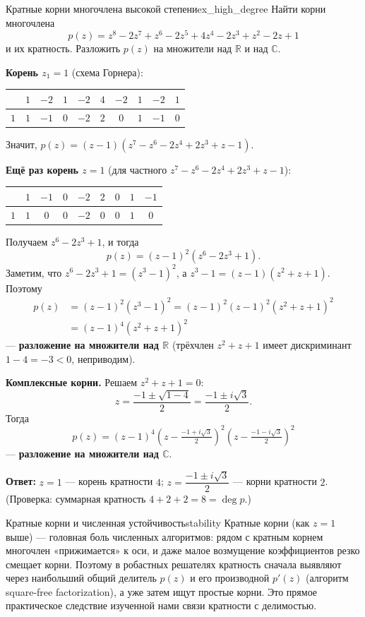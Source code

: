 \documentclass[12pt,a4paper]{article}
\begin{document}
\begin{definition}{Кратные корни многочлена высокой степени}{ex_high_degree}
Найти корни многочлена
\[
p(z) = z^8 - 2z^7 + z^6 - 2z^5 + 4z^4 - 2z^3 + z^2 - 2z + 1
\]
и их кратность. Разложить $p(z)$ на множители над $\mathbb{R}$ и над
$\mathbb{C}$.

\medskip
\textbf{Корень $z_1 = 1$} (схема Горнера):
\begin{center}
\renewcommand{\arraystretch}{1.3}
\begin{tabular}{c|ccccccccc}
& $1$ & $-2$ & $1$ & $-2$ & $4$ & $-2$ & $1$ & $-2$ & $1$ \\
\hline
$1$ & $1$ & $-1$ & $0$ & $-2$ & $2$ & $0$ & $1$ & $-1$ & $0$ \\
\end{tabular}
\end{center}
Значит, $p(z) = (z - 1)(z^7 - z^6 - 2z^4 + 2z^3 + z - 1)$.

\textbf{Ещё раз корень $z = 1$} (для частного $z^7 - z^6 - 2z^4 +
2z^3 + z - 1$):
\begin{center}
\renewcommand{\arraystretch}{1.3}
\begin{tabular}{c|cccccccc}
& $1$ & $-1$ & $0$ & $-2$ & $2$ & $0$ & $1$ & $-1$ \\
\hline
$1$ & $1$ & $0$ & $0$ & $-2$ & $0$ & $0$ & $1$ & $0$ \\
\end{tabular}
\end{center}
Получаем $z^6 - 2z^3 + 1$, и тогда
\[
p(z) = (z - 1)^2 (z^6 - 2z^3 + 1).
\]
Заметим, что $z^6 - 2z^3 + 1 = (z^3 - 1)^2$, а
$z^3 - 1 = (z - 1)(z^2 + z + 1)$. Поэтому
\begin{align*}
p(z) &= (z - 1)^2 (z^3 - 1)^2
= (z - 1)^2 (z - 1)^2 (z^2 + z + 1)^2 \\
&= (z - 1)^4 (z^2 + z + 1)^2
\end{align*}
— \textbf{разложение на множители над $\mathbb{R}$} (трёхчлен
$z^2 + z + 1$ имеет дискриминант $1 - 4 = -3 < 0$, неприводим).

\textbf{Комплексные корни.} Решаем $z^2 + z + 1 = 0$:
\[
z = \frac{-1 \pm \sqrt{1 - 4}}{2} = \frac{-1 \pm i\sqrt{3}}{2}.
\]
Тогда
\[
p(z) = (z - 1)^4
\left(z - \tfrac{-1 + i\sqrt{3}}{2}\right)^2
\left(z - \tfrac{-1 - i\sqrt{3}}{2}\right)^2
\]
— \textbf{разложение на множители над $\mathbb{C}$}.

\textbf{Ответ:} $z = 1$ — корень кратности $4$;
$z = \dfrac{-1 \pm i\sqrt{3}}{2}$ — корни кратности $2$.
(Проверка: суммарная кратность $4 + 2 + 2 = 8 = \deg p$.)
\end{definition}

\begin{remarkIT}{Кратные корни и численная устойчивость}{stability}
Кратные корни (как $z = 1$ выше) — головная боль численных
алгоритмов: рядом с кратным корнем многочлен «прижимается» к оси, и
даже малое возмущение коэффициентов резко смещает корни. Поэтому в
робастных решателях кратность сначала выявляют через наибольший
общий делитель $p(z)$ и его производной $p'(z)$ (алгоритм
square-free factorization), а уже затем ищут простые корни. Это
прямое практическое следствие изученной нами связи кратности с
делимостью.
\end{remarkIT}
\end{document}
